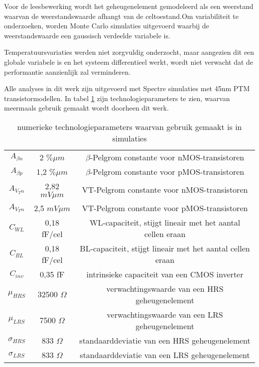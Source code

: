 Voor de leesbewerking wordt het geheugenelement gemodeleerd als een weerstand waarvan de weerstandswaarde afhangt van de celtoestand.Om variabiliteit te onderzoeken, worden Monte Carlo simulaties uitgevoerd waarbij de weerstandswaarde een gaussisch verdeelde variabele is.

Temperatuursvariaties werden niet zorgvuldig onderzocht, maar aangezien dit een globale variabele is en het systeem differentieel werkt, wordt niet verwacht dat de performantie aanzienlijk zal verminderen.

Alle analyses in dit werk zijn uitgevoerd met Spectre simulaties met 45nm PTM transistormodellen. In tabel \ref{tab:properties} zijn technologieparameters te zien, waarvan meermaals gebruik gemaakt wordt doorheen dit werk.

\begin{table}
	\begin{tabular}{ccc}
	\hline
    $A_{\beta n}$ & 2 $\% \mu m$ & $\beta$-Pelgrom constante voor nMOS-transistoren \\
    $A_{\beta p}$ & 1,2 $\% \mu m$ & $\beta$-Pelgrom constante voor pMOS-transistoren \\
    $A_{V_{T} n}$ & 2,82 $mV \mu m$ & VT-Pelgrom constante voor nMOS-transistoren \\
    $A_{V_{T} n}$ & 2,5 $mV \mu m$ & VT-Pelgrom constante voor pMOS-transistoren \\
    $C_{WL}$ & 0,18 fF/cel & WL-capaciteit, stijgt lineair met het aantal cellen eraan \\
    $C_{BL}$ & 0,18 fF/cel & BL-capaciteit, stijgt lineair met het aantal cellen eraan \\
    $C_{inv}$ & 0,35 fF & intrinsieke capaciteit van een CMOS inverter \\
    $\mu_{HRS}$ & 32500 $\Omega$ & verwachtingswaarde van een HRS geheugenelement \\
    $\mu_{LRS}$ & 7500 $\Omega$ & verwachtingswaarde van een LRS geheugenelement \\
    $\sigma_{HRS}$ & 833 $\Omega$ & standaarddeviatie van een HRS geheugenelement \\
    $\sigma_{LRS}$ & 833 $\Omega$ & standaarddeviatie van een LRS geheugenelement \\
    \hline
  \end{tabular}
  \caption{numerieke technologieparameters waarvan gebruik gemaakt is in simulaties}
  \label{tab:properties}
\end{table}


